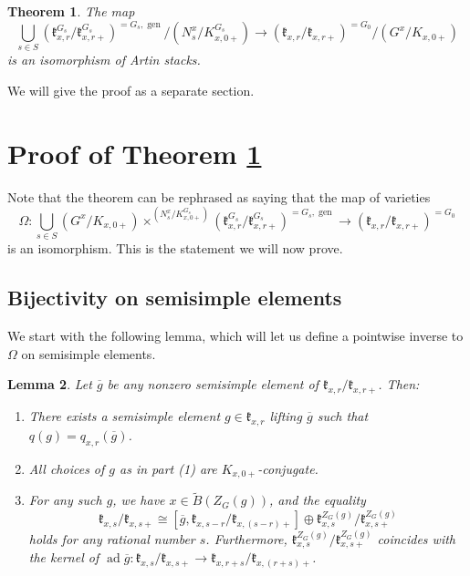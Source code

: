 \documentclass[12pt]{article}
\newcommand{\on}{\operatorname}
\newtheorem{theorem}{Theorem}[section]
\newtheorem{lemma}[theorem]{Lemma}
\theoremstyle{remark}
\begin{document}
\begin{theorem}\label{basecase}
The map
\[
\displaystyle\bigcup_{s\in S}(\mathfrak{k}_{x,r}^{G_s}/\mathfrak{k}_{x,r+}^{G_s})^{=G_s,\on{gen}}/(N^x_s/K_{x,0+}^{G_s})\rightarrow(\mathfrak{k}_{x,r}/\mathfrak{k}_{x,r+})^{=G_0}/(G^x/K_{x,0+})
\]
is an isomorphism of Artin stacks.
\end{theorem}

We will give the proof as a separate section.

\section{Proof of Theorem \ref{basecase}}\label{s:proof}

Note that the theorem can be rephrased as saying that the map of varieties
\[
\Omega:\displaystyle\bigcup_{s\in S}(G^x/K_{x,0+})\times^{(N^x_s/K_{x,0+}^{G_s})}(\mathfrak{k}_{x,r}^{G_s}/\mathfrak{k}_{x,r+}^{G_s})^{=G_s,\on{gen}}\rightarrow(\mathfrak{k}_{x,r}/\mathfrak{k}_{x,r+})^{=G_0}
\]
is an isomorphism. This is the statement we will now prove.

\subsection{Bijectivity on semisimple elements}

We start with the following lemma, which will let us define a pointwise inverse to $\Omega$ on semisimple elements.

\begin{lemma}\label{inverseconstruction}
Let $\overline{g}$ be any nonzero semisimple element of $\mathfrak{k}_{x,r}/\mathfrak{k}_{x,r+}$. Then:
\begin{enumerate}
\item There exists a semisimple element $g\in\mathfrak{k}_{x,r}$ lifting $\overline{g}$ such that $q(g)=q_{x,r}(\overline{g})$.
\item All choices of $g$ as in part (1) are $K_{x,0+}$-conjugate.
\item For any such $g$, we have $x\in\widetilde{B}(Z_G(g))$, and the equality
\begin{equation}\label{eq:centralizerdecomp}
\mathfrak{k}_{x,s}/\mathfrak{k}_{x,s+}\cong[\overline{g},\mathfrak{k}_{x,s-r}/\mathfrak{k}_{x,(s-r)+}]\oplus\mathfrak{k}^{Z_G(g)}_{x,s}/\mathfrak{k}^{Z_G(g)}_{x,s+}
\end{equation}
holds for any rational number $s$. Furthermore, $\mathfrak{k}^{Z_G(g)}_{x,s}/\mathfrak{k}^{Z_G(g)}_{x,s+}$ coincides with the kernel of $\on{ad}\overline{g}:\mathfrak{k}_{x,s}/\mathfrak{k}_{x,s+}\rightarrow\mathfrak{k}_{x,r+s}/\mathfrak{k}_{x,(r+s)+}$.
\end{enumerate}
\end{lemma}
\end{document}
